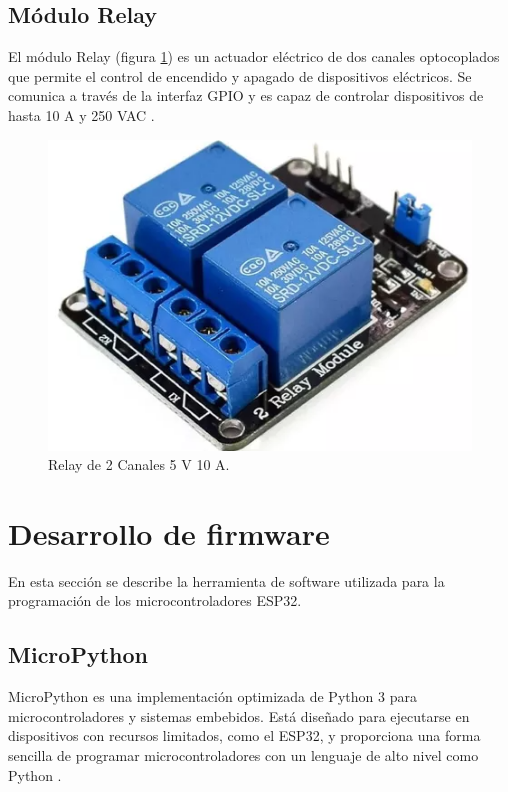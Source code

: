 
\subsection{Módulo Relay}

El módulo Relay (figura \ref{fig:Relay}) es un actuador eléctrico de dos
canales optocoplados que permite el control de encendido y apagado de
dispositivos eléctricos. Se comunica a través de la interfaz GPIO y es capaz de
controlar dispositivos de hasta 10 A y 250 VAC \cite{Relay}.

\begin{figure}[H]
	\centering
	\includegraphics[height=.15\textwidth]{./Images/13.png}
	\caption{Relay de 2 Canales 5 V 10 A\protect\footnotemark.}
	\label{fig:Relay}
\end{figure}



\section{Desarrollo de firmware}

En esta sección se describe la herramienta de software utilizada para la
programación de los microcontroladores ESP32.

\subsection{MicroPython}

MicroPython es una implementación optimizada de Python 3 para
microcontroladores y sistemas embebidos. Está diseñado para ejecutarse en
dispositivos con recursos limitados, como el ESP32, y proporciona una forma
sencilla de programar microcontroladores con un lenguaje de alto nivel como
Python \cite{MicroPython}.

